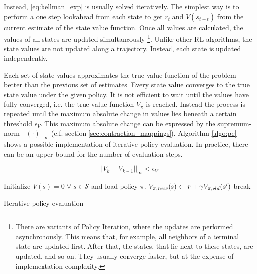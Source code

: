 Instead, \ref{eq:bellman_exp} is usually solved iteratively. The simplest way is to perform a one step lookahead from each state to get $r_t$ and $V(s_{t+t})$ from the current estimate of the state value function. Once all values are calculated, the values of all states are updated simultaneously \footnote{There are variants of Policy Iteration, where the updates are performed asynchronously. This means that, for example, all neighbors of a terminal state are updated first. After that, the states, that lie next to these states, are updated, and so on. They usually converge faster, but at the expense of implementation complexity.}. Unlike other RL-algorithms, the state values are not updated along a trajectory. Instead, each state is updated independently.

Each set of state values approximates the true value function of the problem better than the previous set of estimates. Every state value converges to the true state value under the given policy. It is not efficient to wait until the values have fully converged, i.e. the true value function $V_\pi$ is reached. Instead the process is repeated until the maximum absolute change in values lies beneath a certain threshold $\epsilon_V$. This maximum absolute change can be expressed by the supremum-norm $||(\cdot)||_\infty$ (c.f. section \ref{sec:contraction_mappings}). Algorithm \ref{algo:pe} shows a possible implementation of iterative policy evaluation. In practice, there can be an upper bound for the number of evaluation steps.

\begin{equation}
||V_{k}-V_{k-1}||_\infty<\epsilon_V
\label{eq:pe_stopping_criterion}
\end{equation}

\begin{algorithm}[hbt]
	
	\begin{algorithmic}[0] %
		
		\State Initialize $V(s) = 0 \; \forall \; s \in \mathcal{S}$ and load policy $\pi$.
		\State $V_{\pi,new}(s) \mathrel{\reflectbox{\ensuremath{\mapsto}}} r+\gamma V_ {\pi,old}(s')$
		\EndFor
		\State break
		\EndIf
		\EndWhile
		\EndFunction
	\end{algorithmic}
	\caption{Iterative policy evaluation}
	\label{algo:pe}
\end{algorithm}

